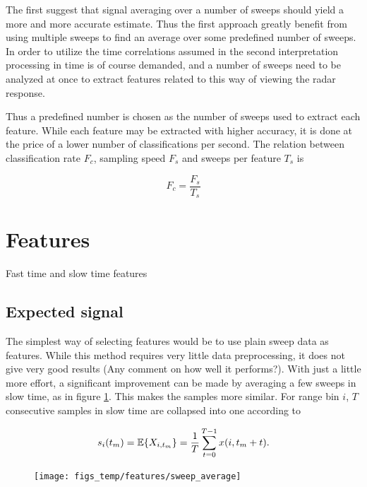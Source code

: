 The first suggest that signal averaging over a number of sweeps should yield a more and more accurate estimate. Thus the first approach greatly benefit from using multiple sweeps to find an average over some predefined number of sweeps.  In order to utilize the time correlations assumed in the second interpretation processing in time is of course demanded, and a number of sweeps need to be analyzed at once to extract features related to this way of viewing the radar response. 

Thus a predefined number is chosen as the number of sweeps used to extract each feature. While each feature may be extracted with higher accuracy, it is done at the price of a lower number of classifications per second. The relation between classification rate $F_c$, sampling speed $F_s$ and sweeps per feature $T_s$ is



\begin{equation}
	F_c = \frac{F_s}{T_s}
\end{equation}

\section{Features}

Fast time and slow time features 



\subsection{Expected signal}
The simplest way of selecting features would be to use plain sweep data as features. While this method requires very little data preprocessing, it does not give very good results (Any comment on how well it performs?). With just a little more effort, a significant improvement can be made by averaging a few sweeps in slow time, as in figure \ref{fig:sweep_average}. This makes the samples more similar.  For range bin $i$, $T$ consecutive samples in slow time are collapsed into one according to

\begin{equation}
	s_i(t_m) = \operatorname*{\mathbb{E}}\{X_{i,t_m}\} = \frac{1}{T}\sum_{t=0}^{T-1}x(i, t_m + t).
\end{equation}

\begin{figure}[h]
	\centering
	\texttt{[image: figs\_temp/features/sweep\_average]}
	\caption{}
	\label{fig:sweep_average}
\end{figure}

